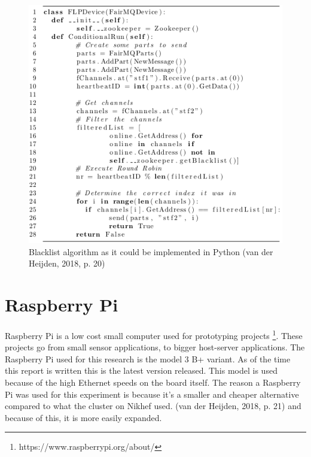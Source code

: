 \begin{figure}[htb]
	\centering
	\includegraphics[scale=0.6]{./graphics/BlacklistAlgorithm.png}
	\caption{Blacklist algorithm as it could be implemented in Python (van der Heijden, 2018, p. 20)}
	\label{fig:BlacklistAlgorithm}
\end{figure}


\section{Raspberry Pi}
Raspberry Pi is a  low cost small computer used for prototyping projects \footnote{https://www.raspberrypi.org/about/}. These projects go from small sensor applications, to bigger host-server applications. The Raspberry Pi used for this research is the model 3 B+ variant. As of the time this report is written this is the latest version released. This model is used because of the high Ethernet speeds on the board itself. The reason a Raspberry Pi was used for this experiment is because it's a smaller and cheaper alternative compared to what the cluster on Nikhef used. (van der Heijden, 2018, p. 21) and because of this, it is more easily expanded.